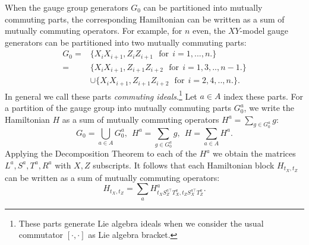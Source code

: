 \documentclass[11pt,oneside]{article}
\def\smbox#1{\ \ \mbox{#1}\ \ }
\begin{document}
When the gauge group generators $G_0$ can be
partitioned into mutually commuting parts, the
corresponding Hamiltonian can be written as a sum
of mutually commuting operators.
For example,
for $n$ even, the $XY$-model gauge generators can
be partitioned into two mutually commuting parts:
\begin{align*}
G_0 = &\{X_i X_{i+1}, Z_i Z_{i+1}\  \smbox{for} i=1,...,n. \} \\
    = &\{X_i X_{i+1}, Z_{i+1} Z_{i+2}\ \smbox{for}  i=1,3,..,n-1. \}\\
    & \cup \{X_i X_{i+1}, Z_{i+1} Z_{i+2}\ \smbox{for}  i=2,4,..,n. \}.
\end{align*}
In general we call these parts \emph{commuting ideals}.\footnote{
These parts generate Lie algebra ideals when we consider 
the usual commutator $[\cdot,\cdot]$ as Lie algebra bracket.}
Let $a\in A$ index these parts. 
For a partition of the gauge group into mutually commuting parts $G_0^{a}$,
we write the Hamiltonian $H$ as a sum of mutually commuting
operators $H^a = \sum_{g\in G_0^{a}} g:$
$$
    G_0 = \bigcup_{a\in A} G_0^{a},\ \  
    H^a = \sum_{g\in G_0^{a}} g,\ \  
    H = \sum_{a\in A} H^a.
$$
%
Applying the Decomposition Theorem to each of the
$H^a$ we obtain the matrices $L^a, S^a, T^a, R^a$ with $X,Z$ subscripts.
It follows that
each Hamiltonian block $ H_{t_X,t_Z} $
can be written as a sum of mutually commuting operators:
$$
    H_{t_X,t_Z} = \sum_a H^a_{t_X S_Z^{a\top} T_X^a, t_Z S_X^{a\top} T_Z^a}.
$$
\end{document}
